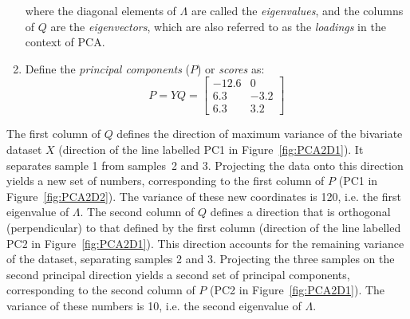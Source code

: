 \begin{enumerate}
  where the diagonal elements of $\Lambda$ are called the
  \emph{eigenvalues}, and the columns of $Q$ are the
  \emph{eigenvectors}, which are also referred to as the
  \emph{loadings} in the context of PCA.

\item Define the \emph{principal components} ($P$) or \emph{scores}
  as:
  \begin{equation}
    P = Y Q = 
    \left[
      \begin{array}{cc}
        -12.6 &  0 \\
          6.3 & -3.2 \\
          6.3 &  3.2
      \end{array}
      \right]
    \label{eq:P}
  \end{equation}

\end{enumerate}

The first column of $Q$ defines the direction of maximum variance of
the bivariate dataset $X$ (direction of the line labelled PC1 in
Figure~\ref{fig:PCA2D1}).  It separates sample 1 from samples~2 and
3. Projecting the data onto this direction yields a new set of
numbers, corresponding to the first column of $P$ (PC1 in
Figure~\ref{fig:PCA2D2}). The variance of these new coordinates is
120, i.e. the first eigenvalue of $\Lambda$. The second column of $Q$
defines a direction that is orthogonal (perpendicular) to that defined
by the first column (direction of the line labelled PC2 in
Figure~\ref{fig:PCA2D1}). This direction accounts for the remaining
variance of the dataset, separating samples 2 and 3. Projecting the
three samples on the second principal direction yields a second set of
principal components, corresponding to the second column of $P$ (PC2
in Figure~\ref{fig:PCA2D1}). The variance of these numbers is 10,
i.e. the second eigenvalue of $\Lambda$.

